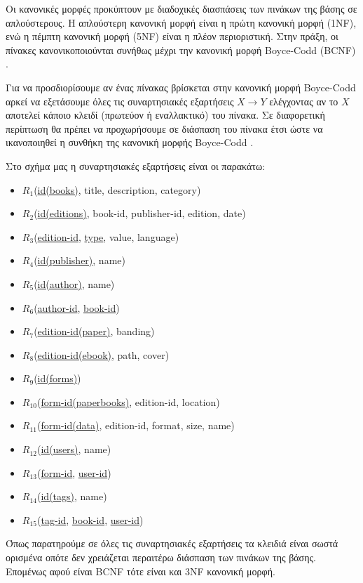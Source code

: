 \documentclass{assignment}
\begin{document}
Οι κανονικές μορφές προκύπτουν με διαδοχικές διασπάσεις των πινάκων της βάσης σε απλούστερους. Η απλούστερη κανονική μορφή είναι η πρώτη κανονική μορφή (1NF), ενώ η πέμπτη κανονική μορφή (5NF) είναι η πλέον περιοριστική. Στην πράξη, οι πίνακες κανονικοποιούνται συνήθως μέχρι την κανονική μορφή Boyce-Codd (BCNF) \cite{baseis_manolopoulos}.

Για να προσδιορίσουμε αν ένας πίνακας βρίσκεται στην κανονική μορφή Boyce-Codd αρκεί να εξετάσουμε όλες τις συναρτησιακές εξαρτήσεις $X \rightarrow Y$ ελέγχοντας αν το $X$ αποτελεί κάποιο κλειδί (πρωτεύον ή εναλλακτικό) του πίνακα. Σε διαφορετική περίπτωση θα πρέπει να προχωρήσουμε σε διάσπαση του πίνακα έτσι ώστε να ικανοποιηθεί η συνθήκη της κανονική μορφής Boyce-Codd \cite{baseis_manolopoulos, wiki:boyce-codd}.

Στο σχήμα μας η συναρτησιακές εξαρτήσεις είναι οι παρακάτω:
\begin{itemize}
\item $R_1$(\underline{id(books)}, title, description, category)
\item $R_2$(\underline{id(editions)}, book-id, publisher-id, edition, date)
\item $R_3$(\underline{edition-id}, \underline{type}, value, language)
\item $R_4$(\underline{id(publisher)}, name)
\item $R_5$(\underline{id(author)}, name)
\item $R_6$(\underline{author-id}, \underline{book-id})
\item $R_7$(\underline{edition-id(paper)}, banding)
\item $R_8$(\underline{edition-id(ebook)}, path, cover)
\item $R_9$(\underline{id(forms)})
\item $R_10$(\underline{form-id(paperbooks)}, edition-id, location)
\item $R_11$(\underline{form-id(data)}, edition-id, format, size, name)
\item $R_12$(\underline{id(users)}, name)
\item $R_13$(\underline{form-id}, \underline{user-id})
\item $R_14$(\underline{id(tags)}, name)
\item $R_15$(\underline{tag-id}, \underline{book-id}, \underline{user-id})
\end{itemize}

Όπως παρατηρούμε σε όλες τις συναρτησιακές εξαρτήσεις τα κλειδιά είναι σωστά ορισμένα οπότε δεν χρειάζεται περαιτέρω διάσπαση των πινάκων της βάσης. Επομένως αφού είναι BCNF τότε είναι και 3NF κανονική μορφή.
\end{document}
